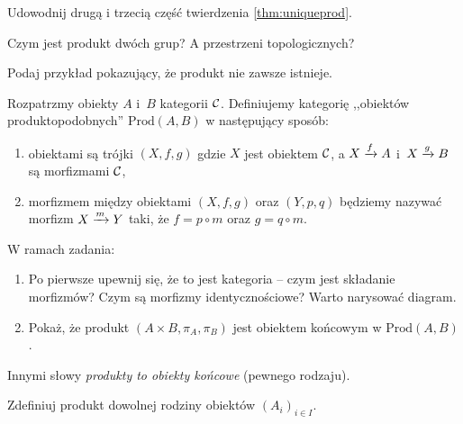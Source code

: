 \begin{exc}
  Udowodnij drugą i trzecią część twierdzenia \ref{thm:uniqueprod}.
\end{exc}

\begin{exc}
  Czym jest produkt dwóch grup? A przestrzeni topologicznych?
\end{exc}

\begin{exc}
  Podaj przykład pokazujący, że produkt nie zawsze istnieje.
\end{exc}

\begin{exc}
  \label{exc:produkt_poczatkowy}
  {
  \newcommand{\Prod}{\text{Prod}(A, B)}
  Rozpatrzmy obiekty $A$ i~$B$ kategorii $\C$. Definiujemy kategorię ,,obiektów produktopodobnych'' $\Prod$ w następujący sposób:
  \begin{enumerate}
    \item obiektami są trójki $(X, f, g)$ gdzie $X$ jest obiektem $\C$, a $\morpharr fXA$ i~$\morpharr gXB$ są morfizmami $\C$,
    \item morfizmem między obiektami $(X, f, g)$ oraz $(Y, p, q)$ będziemy nazywać morfizm $\morpharr mXY$ taki, że $f=p\circ m$ oraz $g=q\circ m$.
  \end{enumerate}

  W ramach zadania:
  \begin{enumerate}
    \item Po pierwsze upewnij się, że to jest kategoria -- czym jest składanie morfizmów? Czym są morfizmy identycznościowe? Warto narysować diagram.
    \item Pokaż, że produkt $(A\times B, \pi_A, \pi_B)$ jest obiektem końcowym w $\Prod$.
  \end{enumerate}

  Innymi słowy \emph{produkty to obiekty końcowe} (pewnego rodzaju).
  }
\end{exc}

\begin{exc}
  Zdefiniuj produkt dowolnej rodziny obiektów $(A_i)_{i\in I}$.
\end{exc}

